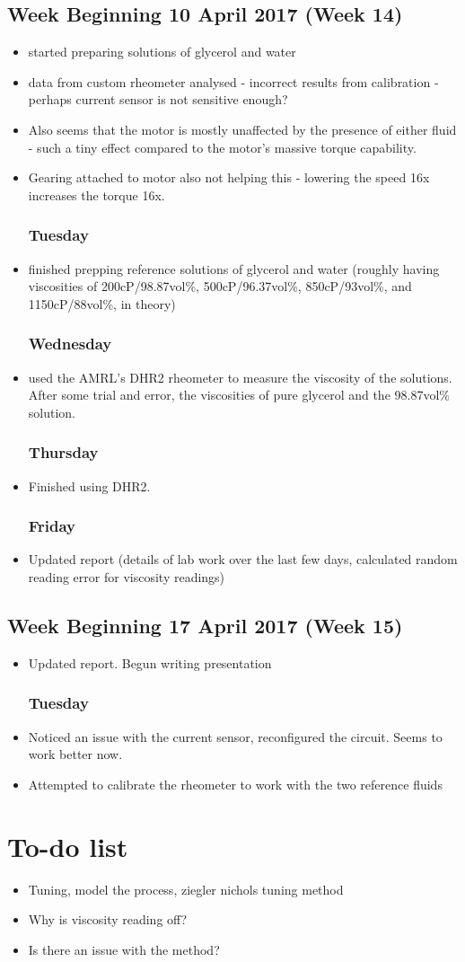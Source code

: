 \documentclass[a4]{report}
\def\mon{\subsection*{Monday}}
\def\tue{\subsection*{Tuesday}}
\def\wed{\subsection*{Wednesday}}
\def\thu{\subsection*{Thursday}}
\def\fri{\subsection*{Friday}}
\begin{document}
	\section{Week Beginning 10 April 2017 (Week 14)}
	\begin{itemize}
		\mon
		\item started preparing solutions of glycerol and water
		\item data from custom rheometer analysed - incorrect results from calibration - perhaps current sensor is not sensitive enough?
		\item Also seems that the motor is mostly unaffected by the presence of either fluid - such a tiny effect compared to the motor's massive torque capability.
		\item Gearing attached to motor also not helping this - lowering the speed 16x increases the torque 16x.
		\tue
		\item finished prepping reference solutions of glycerol and water (roughly having viscosities of 200cP/98.87vol\%, 500cP/96.37vol\%, 850cP/93vol\%, and 1150cP/88vol\%, in theory)
		\wed
		\item used the AMRL's DHR2 rheometer to measure the viscosity of the solutions. After some trial and error, the viscosities of pure glycerol and the 98.87vol\% solution.
		\thu
		\item Finished using DHR2.
		\fri
		\item Updated report (details of lab work over the last few days, calculated random reading error for viscosity readings)
	\end{itemize}
	\newpage
	\section{Week Beginning 17 April 2017 (Week 15)}
	\begin{itemize}
		\mon 
		\item Updated report. Begun writing presentation
		\tue
		\item Noticed an issue with the current sensor, reconfigured the circuit. Seems to work better now. 
		\item Attempted to calibrate the rheometer to work with the two reference fluids
		
	\end{itemize}
	\newpage
	\chapter{To-do list}
	\begin{itemize}
		\item Tuning, model the process, ziegler nichols tuning method
		\item Why is viscosity reading off?
		\item Is there an issue with the method?
	\end{itemize}
\end{document}
